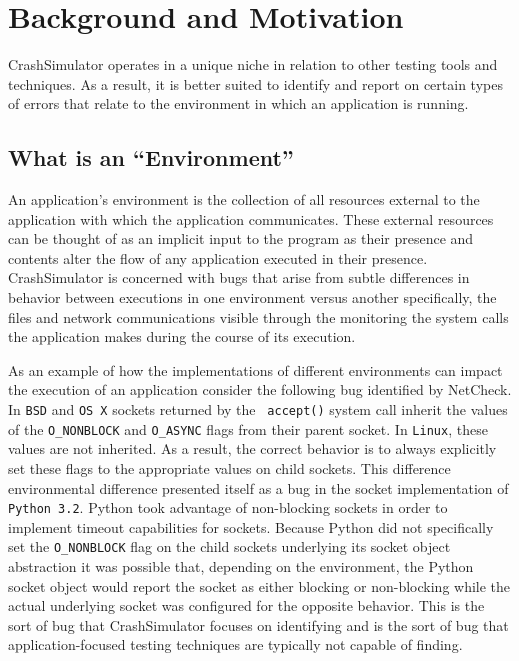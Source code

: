 \section{Background and Motivation}

CrashSimulator operates in a unique niche in relation to other testing tools and techniques. As a result, it is better
suited to identify and report on certain types of errors that relate to the environment in which an application is
running.

    \subsection{What is an ``Environment''}

    An application's environment is the collection of all resources external to the application with which the
    application communicates.  These external resources can be thought of as an implicit input to the program as their
    presence and contents alter the flow of any application executed in their presence. CrashSimulator is concerned with
    bugs that arise from subtle differences in behavior between executions in one environment versus another
    specifically, the files and network communications visible through the monitoring the system calls the application
    makes during the course of its execution.

    As an example of how the implementations of different environments can impact the execution of an application
    consider the following bug identified by NetCheck.  In {\tt BSD} and {\tt OS X} sockets returned by the {\tt
      accept()} system call inherit the values of the {\tt O_NONBLOCK} and {\tt O_ASYNC} flags from their parent
    socket.  In {\tt Linux}, these values are not inherited.  As a result, the correct behavior is to always explicitly
    set these flags to the appropriate values on child sockets.  This difference environmental difference presented
    itself as a bug in the socket implementation of {\tt Python 3.2}.  Python took advantage of non-blocking sockets in
    order to implement timeout capabilities for sockets.  Because Python did not specifically set the {\tt O_NONBLOCK}
    flag on the child sockets underlying its socket object abstraction it was possible that, depending on the
    environment, the Python socket object would report the socket as either blocking or non-blocking while the actual
    underlying socket was configured for the opposite behavior.  This is the sort of bug that CrashSimulator focuses on
    identifying and is the sort of bug that application-focused testing techniques are typically not capable of finding.

